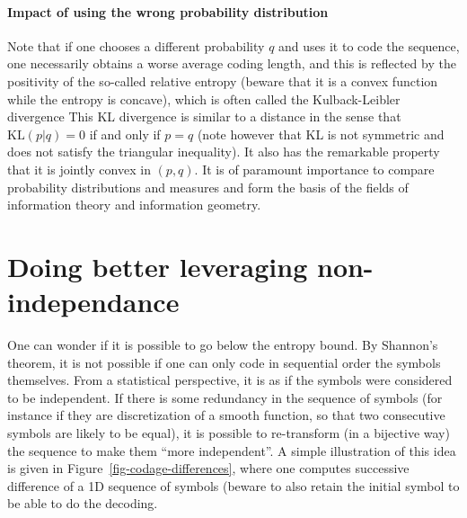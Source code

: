 
\paragraph{Impact of using the wrong probability distribution}

Note that if one chooses a different probability $q$ and uses it to code the sequence, one necessarily obtains a worse average coding length, and this is reflected by the positivity of the so-called relative entropy (beware that it is a convex function while the entropy is concave), which is often called the Kulback-Leibler divergence
This KL divergence is similar to a distance in the sense that $\text{KL}(p|q)=0$ if and only if $p=q$ (note however that KL is not symmetric and does not satisfy the triangular inequality). It also has the remarkable property that it is jointly convex in $(p,q)$. It is of paramount importance to compare probability distributions and measures and form the basis of the fields of information theory and information geometry. 


\section{Doing better leveraging non-independance}

One can wonder if it is possible to go below the entropy bound. By Shannon's theorem, it is not possible if one can only code in sequential order the symbols themselves. From a statistical perspective, it is as if the symbols were considered to be independent. If there is some redundancy in the sequence of symbols (for instance if they are discretization of a smooth function, so that two consecutive symbols are likely to be equal), it is possible to re-transform (in a bijective way) the sequence to make them ``more independent''. A simple illustration of this idea is given in Figure~\ref{fig-codage-differences}, where one computes successive difference of a 1D sequence of symbols (beware to also retain the initial symbol to be able to do the decoding.


